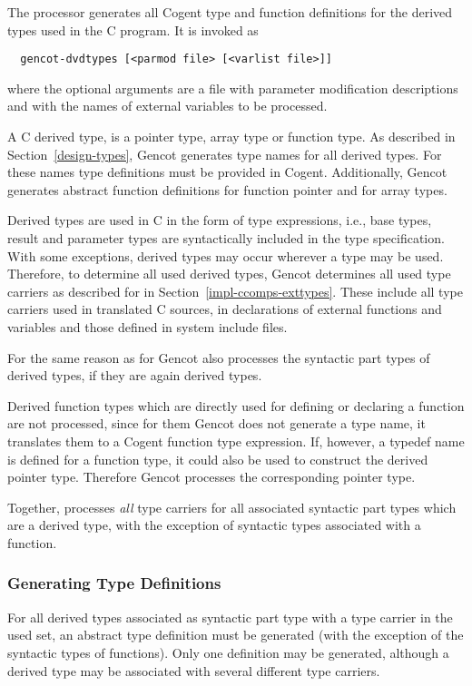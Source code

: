 The processor  generates all Cogent type and function definitions for the derived types
used in the C program. It is invoked as
\begin{verbatim}
  gencot-dvdtypes [<parmod file> [<varlist file>]]
\end{verbatim}
where the optional arguments are a file with parameter modification descriptions and with the names of external
variables to be processed.

A C derived type, is a pointer type, array type or function type. As described in 
Section~\ref{design-types}, Gencot generates type names for all derived types. For these names type definitions
must be provided in Cogent. Additionally, Gencot generates abstract function definitions for function pointer 
and for array types.

Derived types are used in C in the form of type expressions, i.e., base types, result and parameter types are 
syntactically included in the type specification. With some exceptions, derived types may occur wherever a type
may be used. Therefore, to determine all used derived types, Gencot determines all used type carriers as
described for  in Section~\ref{impl-ccomps-exttypes}. These include all type carriers used 
in translated C sources, in declarations of external functions and variables and those defined in system
include files.

For the same reason as for  Gencot also processes the syntactic part types of derived types,
if they are again derived types.

Derived function types which are directly used for defining or declaring a function are not processed, since for them
Gencot does not generate a type name, it translates them to a Cogent function type expression. If, however,
a typedef name is defined for a function type, it could also be used to construct the derived pointer type. Therefore
Gencot processes the corresponding pointer type.

Together,  processes
\textit{all} type carriers for all associated syntactic part types which are a derived type,
with the exception of syntactic types associated with a function.

\subsubsection{Generating Type Definitions}

For all derived types associated as syntactic part type with a type carrier in the used set, an abstract type
definition must be generated (with the exception of the syntactic types of functions). Only one definition
may be generated, although a derived type may be associated with several different type carriers.

